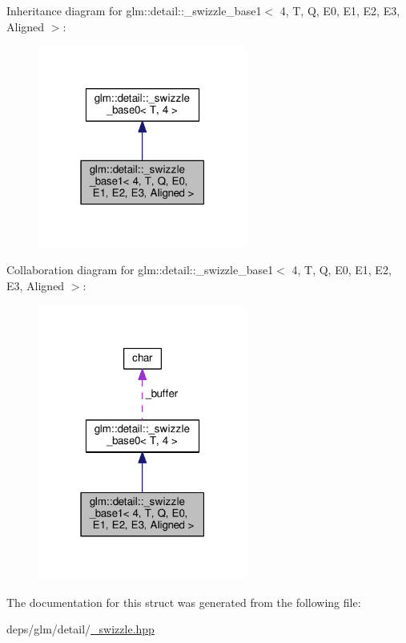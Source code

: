 Inheritance diagram for glm\+:\+:detail\+:\+:\+\_\+swizzle\+\_\+base1$<$ 4, T, Q, E0, E1, E2, E3, Aligned $>$\+:
\nopagebreak
\begin{figure}[H]
\begin{center}
\leavevmode
\includegraphics[width=195pt]{db/db3/structglm_1_1detail_1_1__swizzle__base1_3_014_00_01T_00_01Q_00_01E0_00_01E1_00_01E2_00_01E3_00_01Aligned_01_4__inherit__graph}
\end{center}
\end{figure}


Collaboration diagram for glm\+:\+:detail\+:\+:\+\_\+swizzle\+\_\+base1$<$ 4, T, Q, E0, E1, E2, E3, Aligned $>$\+:
\nopagebreak
\begin{figure}[H]
\begin{center}
\leavevmode
\includegraphics[width=195pt]{d6/df4/structglm_1_1detail_1_1__swizzle__base1_3_014_00_01T_00_01Q_00_01E0_00_01E1_00_01E2_00_01E3_00_01Aligned_01_4__coll__graph}
\end{center}
\end{figure}


The documentation for this struct was generated from the following file\+:\begin{DoxyCompactItemize}
\item 
deps/glm/detail/\hyperlink{__swizzle_8hpp}{\+\_\+swizzle.\+hpp}\end{DoxyCompactItemize}
